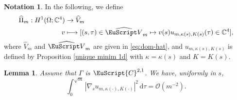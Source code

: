 \documentclass[10pt]{amsart}
\let\mathcal \EuScript
\newcommand\mto{\mathchoice{\longmapsto}{\mapsto}{\mapsto}{\mapsto}}
\newcommand{\scrO}{\mathscr{O}}
\newcommand{\cC}{\mathcal{C}}
\theoremstyle{plain}
\newtheorem{lemma}[theorem]{Lemma}
\theoremstyle{definition}
\newtheorem{notation}[theorem]{Notation}
\newcommand{\CC}{\mathbb{C}}
\newcommand{\dx}{\mathrm{\,d}}
\begin{document}
\begin{notation}\label{not.vkK}
In the following, we define
\begin{align*}
\widehat{\Pi}_m : H^{1}(\Omega; \CC^4) &\to \widehat{V}_m
\\
v &\mto [(s,\tau)\in \widehat{\mathcal V}_{m}\mapsto v(s)u_{m,\kappa(s),K(s)}(\tau)\in \CC^4],
\end{align*}
where $\widehat{V}_m$ and $\widehat{\mathcal V}_{m}$ are given in \eqref{eq:dom-hat}, and $u_{m,\kappa(s),K(s)}$ is defined by Proposition \ref{unique minim 1d} with $\kappa = \kappa(s) $ and $K = K(s)$.
\end{notation}
\begin{lemma}\label{lem.deriv-u}
Assume that $\Gamma$ is $\cC^{2,1}$.
We have, uniformly in $s$,
\[\int_0^{\sqrt{m}}|\nabla_s u_{m,\kappa(\cdot),K(\cdot)}|^2\dx\tau=\scrO(m^{-2}).\]
\end{lemma}
\end{document}
